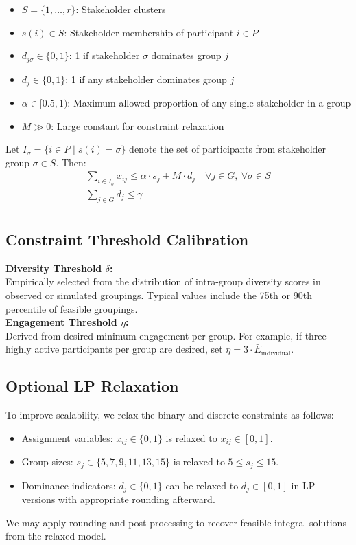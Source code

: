 \begin{itemize}
    \item $S = \{1, \dots, r\}$: Stakeholder clusters
    \item $s(i) \in S$: Stakeholder membership of participant $i \in P$
    \item $d_{j\sigma} \in \{0,1\}$: 1 if stakeholder $\sigma$ dominates group $j$
    \item $d_j \in \{0,1\}$: 1 if any stakeholder dominates group $j$
    \item $\alpha \in [0.5, 1)$: Maximum allowed proportion of any single stakeholder in a group
    \item $M \gg 0$: Large constant for constraint relaxation
\end{itemize}

Let \(I_\sigma = \{i \in P \mid s(i) = \sigma\}\) denote the set of participants from stakeholder group \(\sigma \in S\).
Then:
\begin{gather*}
    \sum_{i \in I_\sigma} x_{ij} \leq \alpha \cdot s_j + M \cdot d_j \quad \forall j \in G,\ \forall \sigma \in S\\
    \sum_{j \in G} d_j \leq \gamma\\
\end{gather*}
\noindent



\subsection*{Constraint Threshold Calibration}
\textbf{Diversity Threshold \(\delta\):}\\[3pt]
Empirically selected from the distribution of intra-group diversity scores in observed or simulated groupings.
Typical values include the 75th or 90th percentile of feasible groupings.
\\
\noindent
\textbf{Engagement Threshold \(\eta\):}\\[3pt]
Derived from desired minimum engagement per group.
For example, if three highly active participants per group are desired,
set \(\eta = 3 \cdot \bar{E}_{\text{individual}}\).

\subsection*{Optional LP Relaxation}

To improve scalability, we relax the binary and discrete constraints as follows:
\begin{itemize}
    \item Assignment variables: \quad $x_{ij} \in \{0,1\}$ is relaxed to $x_{ij} \in [0,1]$.
    \item Group sizes: \quad $s_j \in \{5,7,9,11,13,15\}$ is relaxed to $5 \leq s_j \leq 15$.
    \item Dominance indicators: \quad $d_j \in \{0,1\}$ can be relaxed to $d_j \in [0,1]$ in LP versions with appropriate rounding afterward.
\end{itemize}
We may apply rounding and post-processing to recover feasible integral solutions from the relaxed model.
